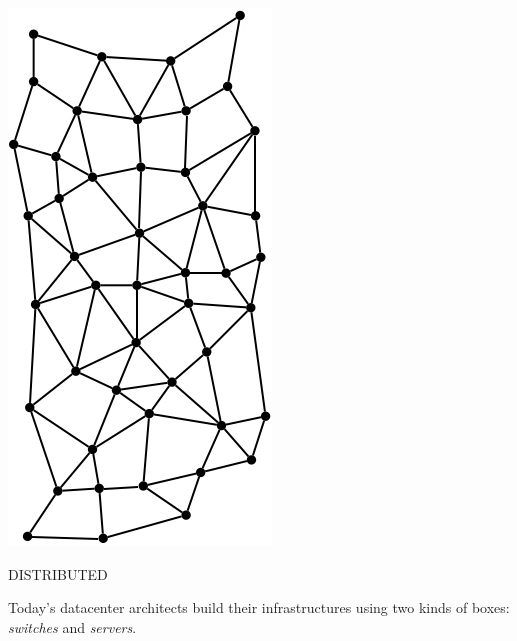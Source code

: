 \documentclass[../HFT-main.tex]{subfiles}
\begin{document}





\begin{marginfigure}
  \includegraphics[width=0.6\linewidth]{../figures/Baran-Distributed.png}
  \caption{DISTRIBUTED}
    \vspace{12pt}
\end{marginfigure}
 
Today's datacenter architects build their infrastructures using two kinds of boxes: \emph{switches} and \emph{servers}.
\end{document}
